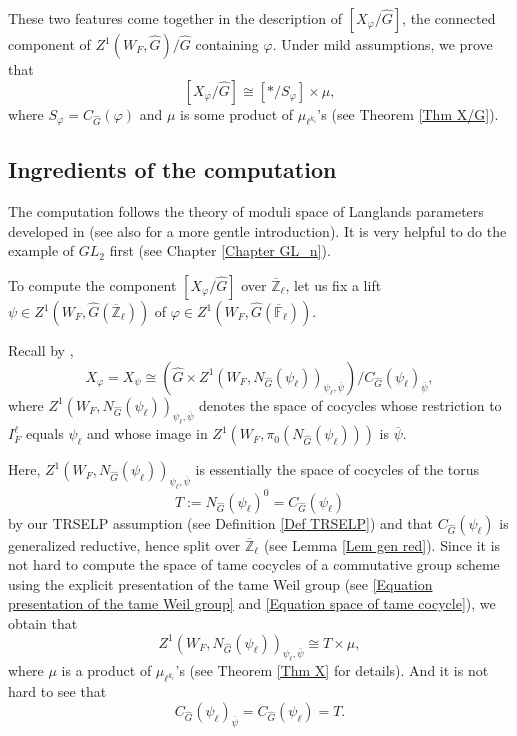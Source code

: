 These two features come together in the description of $[X_{\varphi}/\hat{G}]$, the connected component of $Z^1(W_F, \hat{G})/\hat{G}$ containing $\varphi$. Under mild assumptions, we prove that
$$[X_{\varphi}/\hat{G}] \cong [*/S_{\varphi}]\times \mu,$$
where $S_{\varphi}=C_{\hat{G}}(\varphi)$ and $\mu$ is some product of $\mu_{\ell^{k_i}}$'s (see Theorem \ref{Thm X/G}).

\subsection{Ingredients of the computation}

The computation follows the theory of moduli space of Langlands parameters developed in \cite[Section 2, 4]{dhkm2020moduli} (see also \cite[Section 3, 4]{dat2022ihes} for a more gentle introduction). It is very helpful to do the example of $GL_2$ first (see Chapter \ref{Chapter GL_n}).

To compute the component $[X_{\varphi}/\hat{G}]$ over $\overline{\mathbb{Z}}_{\ell}$, let us fix a lift $\psi \in Z^1(W_F, \hat{G}(\overline{\mathbb{Z}}_{\ell}))$ of $\varphi \in Z^1(W_F, \hat{G}(\overline{\mathbb{F}}_{\ell}))$.

Recall by \cite[Subsection 4.6]{dat2022ihes},
$$X_{\varphi}=X_{\psi} \cong \left(\hat{G} \times Z^1(W_F, N_{\hat{G}}(\psi_{\ell}))_{\psi_{\ell}, \overline{\psi}}\right)/C_{\hat{G}}(\psi_{\ell})_{\overline{\psi}},$$
where $Z^1(W_F, N_{\hat{G}}(\psi_{\ell}))_{\psi_{\ell}, \overline{\psi}}$  denotes the space of cocycles whose restriction to $I_F^{\ell}$ equals $\psi_{\ell}$ and whose image in $Z^1(W_F, \pi_0(N_{\hat{G}}(\psi_{\ell})))$ is $\overline{\psi}$. 

Here, $Z^1(W_F, N_{\hat{G}}(\psi_{\ell}))_{\psi_{\ell}, \overline{\psi}}$ is essentially the space of cocycles of the torus $$T:=N_{\hat{G}}(\psi_{\ell})^0=C_{\hat{G}}(\psi_{\ell})$$
by our TRSELP assumption (see Definition \ref{Def TRSELP}) and that $C_{\hat{G}}(\psi_{\ell})$ is generalized reductive, hence split over $\overline{\mathbb{Z}}_{\ell}$ (see Lemma \ref{Lem gen red}). Since it is not hard to compute the space of tame cocycles of a commutative group scheme using the explicit presentation of the tame Weil group (see \eqref{Equation presentation of the tame Weil group} and \eqref{Equation space of tame cocycle}), we obtain that 
$$Z^1(W_F, N_{\hat{G}}(\psi_{\ell}))_{\psi_{\ell}, \overline{\psi}} \cong T \times \mu,$$
where $\mu$ is a product of $\mu_{\ell^{k_i}}$'s (see Theorem \ref{Thm X} for details).
And it is not hard to see that
$$C_{\hat{G}}(\psi_{\ell})_{\overline{\psi}}=C_{\hat{G}}(\psi_{\ell})=T.$$

